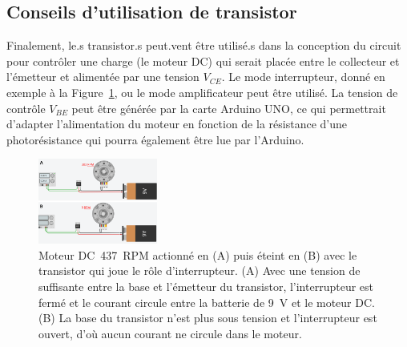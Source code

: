 \documentclass[english,french,12pt]{article}
\begin{document}
\subsection*{Conseils d'utilisation de transistor}
Finalement, le.s transistor.s peut.vent être utilisé.s dans la conception du circuit pour contrôler une charge (le moteur DC) qui serait placée entre le collecteur et l'émetteur et alimentée par une tension $V_{CE}$. Le mode interrupteur, donné en exemple à la Figure~\ref{fig:InterrupteurMoteur}, ou le mode amplificateur peut être utilisé. La tension de contrôle $V_{BE}$ peut être générée par la carte Arduino UNO, ce qui permettrait d’adapter l’alimentation du moteur en fonction de la résistance d’une photorésistance qui pourra également être lue par l’Arduino.

\begin{figure}[h]
    \centering
    \includegraphics[width=0.35\textwidth]{InterrupteurMoteur.png}
    \caption{Moteur DC~437~RPM actionné en (A) puis éteint en (B) avec le transistor qui joue le rôle d'interrupteur. (A) Avec une tension de suffisante entre la base et l'émetteur du transistor, l’interrupteur est fermé et le courant circule entre la batterie de \SI{9}{\volt} et le moteur DC. (B) La base du transistor n'est plus sous tension et l'interrupteur est ouvert, d'où aucun courant ne circule dans le moteur.}
    \label{fig:InterrupteurMoteur}
\end{figure}
\end{document}
